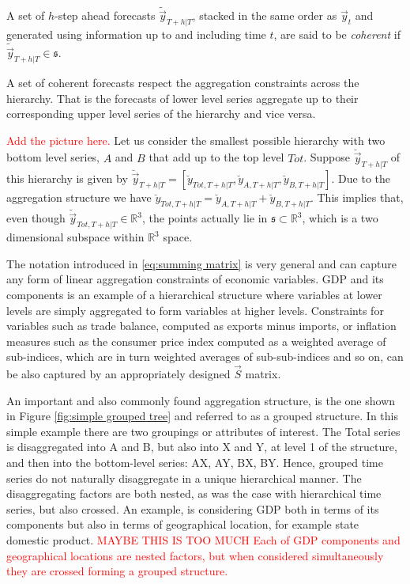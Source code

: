 \documentclass[graybox]{svmult}
\begin{document}
\begin{definition}
A set of $h$-step ahead forecasts $\tilde{\vec{y}}_{T+h|T}$, stacked in the same order as $\vec{y}_{t}$ and generated using information up to and including time $t$,
are said to be \textit{coherent} if $\tilde{\vec{y}}_{T+h|T} \in \mathfrak{s}$.
  \label{def:coherence}
\end{definition}

A set of coherent forecasts respect the aggregation constraints across the hierarchy. That is the forecasts of lower level series aggregate up to their corresponding upper level series of the hierarchy and vice versa.

\textcolor{red}{Add the picture here.}
Let us consider the smallest possible hierarchy with two bottom level series, $A$ and $B$ that add up to the top level $Tot$. Suppose $\breve{\vec{y}}_{T+h|T}$ of this hierarchy is given by $\breve{\vec{y}}_{T+h|T} = [\breve{y}_{Tot,T+h|T},\breve{y}_{A,T+h|T}, \breve{y}_{B,T+h|T}]$. Due to the aggregation structure we have $\breve{y}_{Tot,T+h|T}=\breve{y}_{A,T+h|T}+\breve{y}_{B,T+h|T}$. This implies that, even though  $\breve{\vec{y}}_{Tot,T+h|T} \in \mathbb{R}^3$, the points actually lie in $\mathfrak{s}\subset \mathbb{R}^3$, which is a two dimensional subspace within $\mathbb{R}^3$ space.

The notation introduced in \eqref{eq:summing matrix} is very general and can capture any form of linear aggregation constraints of economic variables. GDP and its components is an example of a hierarchical structure where variables at lower levels are simply aggregated to form variables at higher levels. Constraints for variables such as trade balance, computed as exports minus imports, or inflation measures such as the consumer price index computed as a weighted average of sub-indices, which are in turn weighted averages of sub-sub-indices and so on, can be also captured by an appropriately designed $\vec{S}$ matrix.

An important and also commonly found aggregation structure, is the one shown in Figure \ref{fig:simple grouped tree} and referred to as a grouped structure. In this simple example there are two groupings or attributes of interest. The Total series is disaggregated into A and B, but also into X and Y, at level 1 of the structure, and then into the bottom-level series: AX, AY, BX, BY. Hence, grouped time series do not naturally disaggregate in a unique hierarchical manner. The disaggregating factors are both nested, as was the case with hierarchical time series, but also crossed. An example, is considering GDP both in terms of its components but also in terms of geographical location, for example state domestic product. \textcolor{red}{MAYBE THIS IS TOO MUCH Each of GDP components and geographical locations are nested factors, but when considered simultaneously they are crossed forming a grouped structure.}
\end{document}

